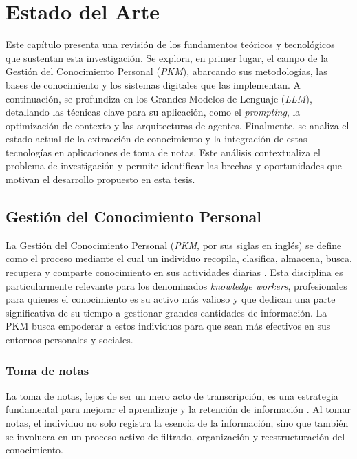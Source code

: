 \chapter{Estado del Arte}
\label{chapter:estado_del_arte}

Este capítulo presenta una revisión de los fundamentos teóricos y tecnológicos que sustentan esta investigación. Se explora, en primer lugar, el campo de la Gestión del Conocimiento Personal (\textit{PKM}), abarcando sus metodologías, las bases de conocimiento y los sistemas digitales que las implementan. A continuación, se profundiza en los Grandes Modelos de Lenguaje (\textit{LLM}), detallando las técnicas clave para su aplicación, como el \textit{prompting}, la optimización de contexto y las arquitecturas de agentes. Finalmente, se analiza el estado actual de la extracción de conocimiento y la integración de estas tecnologías en aplicaciones de toma de notas. Este análisis contextualiza el problema de investigación y permite identificar las brechas y oportunidades que motivan el desarrollo propuesto en esta tesis.

\section{Gestión del Conocimiento Personal}
\label{sec:pkm}
La Gestión del Conocimiento Personal (\textit{PKM}, por sus siglas en inglés) se define como el proceso mediante el cual un individuo recopila, clasifica, almacena, busca, recupera y comparte conocimiento en sus actividades diarias \parencite{grundspenkisAgentBasedApproach2007}. Esta disciplina es particularmente relevante para los denominados \textit{knowledge workers}, profesionales para quienes el conocimiento es su activo más valioso y que dedican una parte significativa de su tiempo a gestionar grandes cantidades de información. La PKM busca empoderar a estos individuos para que sean más efectivos en sus entornos personales y sociales.

\subsection{Toma de notas}
La toma de notas, lejos de ser un mero acto de transcripción, es una estrategia fundamental para mejorar el aprendizaje y la retención de información \parencite{jansenIntegrativeReviewCognitive2017}. Al tomar notas, el individuo no solo registra la esencia de la información, sino que también se involucra en un proceso activo de filtrado, organización y reestructuración del conocimiento.

